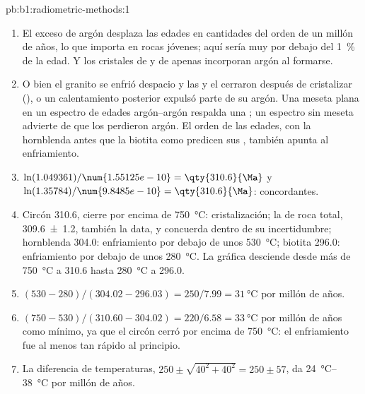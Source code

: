 \begin{solution}{pb:b1:radiometric-methods:1}
\begin{enumerate}
  \item El exceso de argón desplaza las edades en cantidades del orden de un millón de años, lo que importa en rocas jóvenes; aquí sería muy por debajo del \qty{1}{\percent} de la edad. Y los cristales de  y de  apenas incorporan argón al formarse.
  \item O bien el granito se enfrió despacio y las  y el  cerraron después de cristalizar (), o un calentamiento posterior expulsó parte de su argón. Una meseta plana en un espectro de edades argón--argón respalda una ; un espectro sin meseta advierte de que los  perdieron argón. El orden de las edades, con la hornblenda antes que la biotita como predicen sus , también apunta al enfriamiento.
  \item $\ln(1.049361)/\num{1.55125e-10} = \qty{310.6}{\Ma}$ y
        $\ln(1.35784)/\num{9.8485e-10} = \qty{310.6}{\Ma}$: concordantes.
  \item Circón \qty{310.6}{\Ma}, cierre por encima de \qty{750}{\celsius}:
        cristalización; la  de roca total,
        \qty[uncertainty-mode=separate]{309.6(12)}{\Ma}, también la data,
        y concuerda dentro de su incertidumbre; hornblenda \qty{304.0}{\Ma}: enfriamiento
        por debajo de unos \qty{530}{\celsius}; biotita \qty{296.0}{\Ma}: enfriamiento
        por debajo de unos \qty{280}{\celsius}. La gráfica desciende desde más de
        \qty{750}{\celsius} a \qty{310.6}{\Ma} hasta \qty{280}{\celsius} a
        \qty{296.0}{\Ma}.
  \item $(530 - 280)/(304.02 - 296.03) = 250/7.99 = \qty{31}{\celsius}$ por
        millón de años.
  \item $(750 - 530)/(310.60 - 304.02) = 220/6.58 = \qty{33}{\celsius}$ por
        millón de años como mínimo, ya que el circón cerró por encima de
        \qty{750}{\celsius}: el enfriamiento fue al menos tan rápido al principio.
  \item La diferencia de temperaturas, $250 \pm \sqrt{40^2 + 40^2} = 250 \pm
        57$, da \qtyrange{24}{38}{\celsius} por millón de años.

\end{enumerate}
\end{solution}
